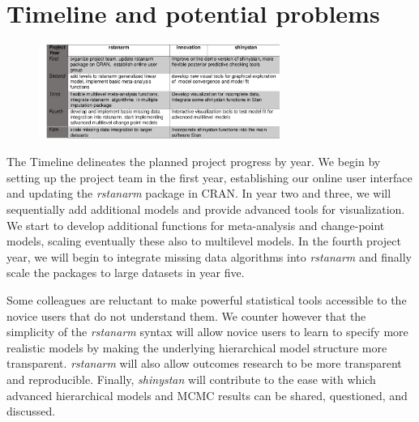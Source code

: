 \documentclass[11pt,notitlepage]{article}
\begin{document}
\section*{Timeline and potential problems}

\begin{figure} %
 \vspace*{-12pt}
    \centering
  \includegraphics[width=0.7\textwidth]{Figures/Timeline.pdf}
 \vspace*{-15pt}
\end{figure}

The Timeline delineates the planned project progress by year. We begin by setting up the project team in the first year, 
establishing our online user interface and updating the \textit{rstanarm} package in CRAN. In year two and three, we will sequentially 
add additional models and provide advanced tools for visualization. We start to develop additional functions for meta-analysis and 
change-point models, scaling eventually these also to multilevel models. In the fourth project year, we will begin to integrate 
missing data algorithms into \textit{rstanarm} and finally scale the packages to large datasets in year five.

Some colleagues are reluctant to make powerful statistical tools accessible to the novice users that do not understand them. We counter 
however that the simplicity of the \textit{rstanarm} syntax will allow novice users to learn to specify more realistic models by 
making the underlying hierarchical model structure more transparent.  \textit{rstanarm} will also allow outcomes research to be 
more transparent and reproducible. Finally, \textit{shinystan} will contribute to the ease with which advanced hierarchical models and MCMC 
results can be shared, questioned, and discussed.

\newpage 

\newpage


\end{document}
